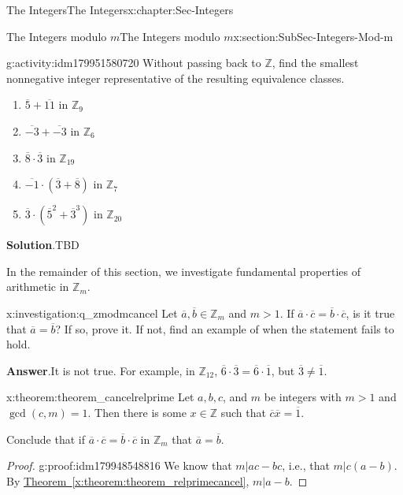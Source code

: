 \documentclass[oneside,10pt,]{book}
\newcommand{\blocktitlefont}{\relax}
\newcommand{\xreffont}{\relax}
\numberwithin{equation}{section}
\def\Z{{\mathbb Z}}
\begin{document}
\begin{chapterptx}{The Integers}{}{The Integers}{}{}{x:chapter:Sec-Integers}
\begin{sectionptx}{The Integers modulo \(m\)}{}{The Integers modulo \(m\)}{}{}{x:section:SubSec-Integers-Mod-m}
\begin{activity}{}{g:activity:idm179951580720}%
Without passing back to \(\Z\), find the smallest nonnegative integer representative of the resulting equivalence classes.%
%
\begin{enumerate}
\item{}\(\overline{5}+\overline{11}\) in \(\Z_{9}\)%
\item{}\(\overline{-3}+\overline{-3}\) in \(\Z_{6}\)%
\item{}\(\overline{8}\cdot\overline{3}\) in \(\Z_{19}\)%
\item{}\(\overline{-1}\cdot(\overline{3}+\overline{8})\) in \(\Z_{7}\)%
\item{}\(\overline{3}\cdot(\overline{5}^2+\overline{3}^3)\) in \(\Z_{20}\)%
\end{enumerate}
\par\smallskip%
\noindent\textbf{\blocktitlefont Solution}.\hypertarget{g:solution:idm179951527104}{}\quad{}TBD\end{activity}
In the remainder of this section, we investigate fundamental properties of arithmetic in \(\Z_m\).%
\begin{investigation}{}{x:investigation:q_zmodmcancel}%
Let \(\overline{a},\overline{b}\in \Z_m\) and \(m > 1\). If \(\overline{a}\cdot \overline{c} = \overline{b}\cdot \overline{c}\), is it true that \(\overline{a} = \overline{b}\)? If so, prove it. If not, find an example of when the statement fails to hold.%
\par\smallskip%
\noindent\textbf{\blocktitlefont Answer}.\hypertarget{g:answer:idm179948449264}{}\quad{}It is not true. For example, in \(\Z_{12}\), \(\overline{6}\cdot \overline{3} = \overline{6}\cdot\overline{1}\), but \(\overline{3}\ne \overline{1}\).%
\end{investigation}
\begin{theorem}{}{}{x:theorem:theorem_cancelrelprime}%
Let \(a,b,c\), and \(m\) be integers with \(m > 1\) and \(\gcd(c,m)=1\). Then there is some \(x\in \Z\) such that \(\overline{c} \overline{x} = \overline{1}\).%
\par
Conclude that if \(\overline{a} \cdot\overline{c} = \overline{b}\cdot\overline{c}\) in \(\Z_m\) that \(\overline{a} = \overline{b}\).%
\end{theorem}
\begin{proof}{}{g:proof:idm179948548816}
We know that \(m|ac-bc\), i.e., that \(m|c(a-b)\). By \hyperref[x:theorem:theorem_relprimecancel]{Theorem~{\xreffont\ref{x:theorem:theorem_relprimecancel}}}, \(m|a-b\).%
\end{proof}

\end{sectionptx}
\end{chapterptx}
\end{document}
